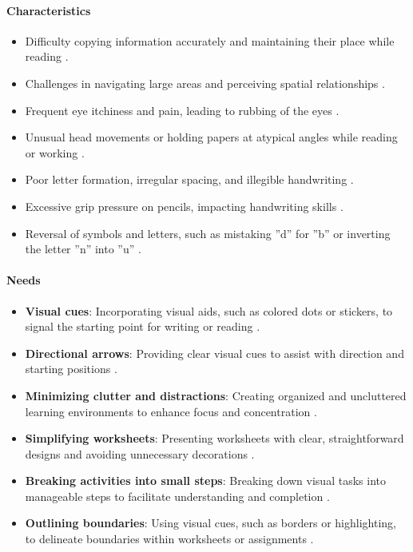 \paragraph{Characteristics}
\begin{itemize}
    \item Difficulty copying information accurately and maintaining their place while reading \cite{Speechify}.
    \item Challenges in navigating large areas and perceiving spatial relationships \cite{PorterAcademy}.
    \item Frequent eye itchiness and pain, leading to rubbing of the eyes \cite{ChildDevelopment}.
    \item Unusual head movements or holding papers at atypical angles while reading or working \cite{Speechify}.
    \item Poor letter formation, irregular spacing, and illegible handwriting \cite{PorterAcademy}.
    \item Excessive grip pressure on pencils, impacting handwriting skills \cite{ScienceDaily}.
    \item Reversal of symbols and letters, such as mistaking ''d'' for ''b'' or inverting the letter ''n'' into ''u'' \cite{ChildDevelopment}.
\end{itemize}

\paragraph{Needs}
\begin{itemize}
    \item \textbf{Visual cues}: Incorporating visual aids, such as colored dots or stickers, to signal the starting point for writing or reading \cite{PorterAcademy}.
    \item \textbf{Directional arrows}: Providing clear visual cues to assist with direction and starting positions \cite{Speechify}.
    \item \textbf{Minimizing clutter and distractions}: Creating organized and uncluttered learning environments to enhance focus and concentration \cite{ChildDevelopment}.
    \item \textbf{Simplifying worksheets}: Presenting worksheets with clear, straightforward designs and avoiding unnecessary decorations \cite{Speechify}.
    \item \textbf{Breaking activities into small steps}: Breaking down visual tasks into manageable steps to facilitate understanding and completion \cite{ScienceDaily}.
    \item \textbf{Outlining boundaries}: Using visual cues, such as borders or highlighting, to delineate boundaries within worksheets or assignments \cite{PorterAcademy}.
\end{itemize}
